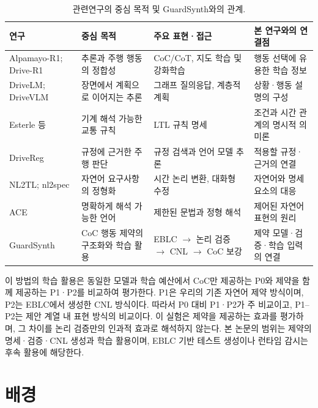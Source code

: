 \documentclass[10pt,a4paper,twocolumn]{article}\usepackage[margin=18mm]{geometry}\usepackage{fontspec,kotex}
\begin{document}
\begin{table}[tp]\caption{관련연구의 중심 목적 및 GuardSynth와의 관계.}
\centering\fontsize{8}{10}\selectfont\setlength{\tabcolsep}{3pt}
\begin{tabular}{@{}>{\raggedright\arraybackslash}p{}>{\raggedright\arraybackslash}p{}>{\raggedright\arraybackslash}p{}>{\raggedright\arraybackslash}p{}@{}}
\toprule
\textbf{연구} & \textbf{중심 목적} & \textbf{주요 표현·접근} & \textbf{본 연구와의 연결점}\\
\midrule
Alpamayo-R1; Drive-R1 \cite{r1,r5} & 추론과 주행 행동의 정합성 & CoC/CoT, 지도 학습 및 강화학습 & 행동 선택에 유용한 학습 정보\\[3pt]
DriveLM; DriveVLM \cite{r2,r3} & 장면에서 계획으로 이어지는 추론 & 그래프 질의응답, 계층적 계획 & 상황·행동 설명의 구성\\[3pt]
Esterle 등 \cite{r6} & 기계 해석 가능한 교통 규칙 & LTL 규칙 명세 & 조건과 시간 관계의 명시적 의미론\\[3pt]
DriveReg \cite{r7} & 규정에 근거한 주행 판단 & 규정 검색과 언어 모델 추론 & 적용할 규정·근거의 연결\\[3pt]
NL2TL; nl2spec \cite{r8,r9} & 자연어 요구사항의 정형화 & 시간 논리 변환, 대화형 수정 & 자연어와 명세 요소의 대응\\[3pt]
ACE \cite{r10} & 명확하게 해석 가능한 언어 & 제한된 문법과 정형 해석 & 제어된 자연어 표현의 원리\\[3pt]
GuardSynth & CoC 행동 제약의 구조화와 학습 활용 & EBLC \ensuremath{\rightarrow} 논리 검증 \ensuremath{\rightarrow} CNL \ensuremath{\rightarrow} CoC 보강 & 제약 모델·검증·학습 입력의 연결\\[3pt]
\bottomrule\end{tabular}
\end{table}

이 방법의 학습 활용은 동일한 모델과 학습 예산에서 CoC만 제공하는 P0와 제약을 함께 제공하는 P1·P2를 비교하여 평가한다. P1은 우리의 기존 자연어 제약 방식이며, P2는 EBLC에서 생성한 CNL 방식이다. 따라서 P0 대비 P1·P2가 주 비교이고, P1--P2는 제안 계열 내 표현 방식의 비교이다. 이 실험은 제약을 제공하는 효과를 평가하며, 그 차이를 논리 검증만의 인과적 효과로 해석하지 않는다. 본 논문의 범위는 제약의 명세·검증·CNL 생성과 학습 활용이며, EBLC 기반 테스트 생성이나 런타임 감시는 후속 활용에 해당한다.\par
\section{배경}
\end{document}
